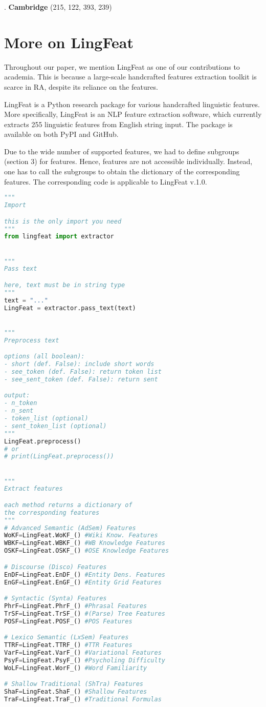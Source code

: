 \documentclass[11pt]{article}
\begin{document}
. \textbf{Cambridge} (215, 122, 393, 239)

\section{More on LingFeat}
Throughout our paper, we mention LingFeat as one of our contributions to academia. This is because a large-scale handcrafted features extraction toolkit is scarce in RA, despite its reliance on the features. 

LingFeat is a Python research package for various handcrafted linguistic features. More specifically, LingFeat is an NLP feature extraction software, which currently extracts 255 linguistic features from English string input. The package is available on both PyPI and GitHub. 

Due to the wide number of supported features, we had to define subgroups (section 3) for features. Hence, features are not accessible individually. Instead, one has to call the subgroups to obtain the dictionary of the corresponding features. The corresponding code is applicable to LingFeat v.1.0.

\newpage
\begin{lstlisting}[language=Python, basicstyle=\fontsize{8}{10}\selectfont\ttfamily]
"""
Import

this is the only import you need
"""
from lingfeat import extractor


"""
Pass text

here, text must be in string type
"""
text = "..."
LingFeat = extractor.pass_text(text)


"""
Preprocess text

options (all boolean):
- short (def. False): include short words
- see_token (def. False): return token list
- see_sent_token (def. False): return sent

output:
- n_token
- n_sent
- token_list (optional)
- sent_token_list (optional)
"""
LingFeat.preprocess()
# or
# print(LingFeat.preprocess())


"""
Extract features

each method returns a dictionary of 
the corresponding features
"""
# Advanced Semantic (AdSem) Features
WoKF=LingFeat.WoKF_() #Wiki Know. Features
WBKF=LingFeat.WBKF_() #WB Knowledge Features
OSKF=LingFeat.OSKF_() #OSE Knowledge Features

# Discourse (Disco) Features
EnDF=LingFeat.EnDF_() #Entity Dens. Features
EnGF=LingFeat.EnGF_() #Entity Grid Features

# Syntactic (Synta) Features
PhrF=LingFeat.PhrF_() #Phrasal Features
TrSF=LingFeat.TrSF_() #(Parse) Tree Features
POSF=LingFeat.POSF_() #POS Features

# Lexico Semantic (LxSem) Features
TTRF=LingFeat.TTRF_() #TTR Features
VarF=LingFeat.VarF_() #Variational Features
PsyF=LingFeat.PsyF_() #Psycholing Difficulty 
WoLF=LingFeat.WorF_() #Word Familiarity

# Shallow Traditional (ShTra) Features
ShaF=LingFeat.ShaF_() #Shallow Features 
TraF=LingFeat.TraF_() #Traditional Formulas 
\end{lstlisting}
\end{document}
